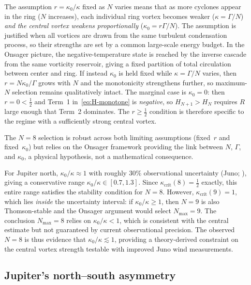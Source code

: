 \begin{remark}
\label{rem:fixed-r}
The assumption $r = \kappa_0/\kappa$ fixed as $N$ varies means that
as more cyclones appear in the ring ($N$ increases), each individual
ring vortex becomes weaker ($\kappa = \Gamma/N$) \emph{and the central
vortex weakens proportionally} ($\kappa_0 = r\Gamma/N$).  The
assumption is justified when all vortices are drawn from the same
turbulent condensation process, so their strengths are set by a common
large-scale energy budget.  In the Onsager picture, the
negative-temperature state is reached by the inverse cascade from the
same vorticity reservoir, giving a fixed partition of total circulation
between center and ring.  If instead $\kappa_0$ is held fixed while
$\kappa = \Gamma/N$ varies, then $r = N\kappa_0/\Gamma$ grows with $N$
and the monotonicity strengthens further, so maximum-$N$ selection
remains qualitatively intact.  The marginal case is $\kappa_0 = 0$:
then $r = 0 < \tfrac12$ and Term~1 in~\eqref{eq:H-monotone} is
\emph{negative}, so $H_{N+1} > H_N$ requires $R$ large enough that
Term~2 dominates.  The $r \ge \tfrac{1}{2}$ condition is therefore
specific to the regime with a sufficiently strong central vortex.

The $N = 8$ selection is robust across both limiting assumptions
(fixed~$r$ and fixed~$\kappa_0$) but relies on the Onsager framework
providing the link between $N$, $\Gamma$, and $\kappa_0$, a physical
hypothesis, not a mathematical consequence.
\end{remark}

\noindent
For Jupiter north, $\kappa_0/\kappa \approx 1$ with roughly 30\%
observational uncertainty (Juno; \citealt{Adriani2018}), giving a
conservative range $\kappa_0/\kappa \in [0.7, 1.3]$.  Since
$\kappa_{\mathrm{crit}}(8) = \tfrac{1}{2}$ exactly, this entire
range satisfies the stability condition for $N = 8$.  However,
$\kappa_{\mathrm{crit}}(9) = 1$, which lies \emph{inside} the
uncertainty interval: if $\kappa_0/\kappa \ge 1$, then $N = 9$ is also
Thomson-stable and the Onsager argument would select $N_{\max} = 9$.
The conclusion $N_{\max} = 8$ relies on $\kappa_0/\kappa < 1$, which is
consistent with the central estimate but not guaranteed by current
observational precision.  The observed $N = 8$ is thus evidence that
$\kappa_0/\kappa \lesssim 1$, providing a theory-derived constraint on
the central vortex strength testable with improved Juno wind
measurements.

\subsection{Jupiter's north--south asymmetry}
\label{sec:jupiter-asymmetry}

